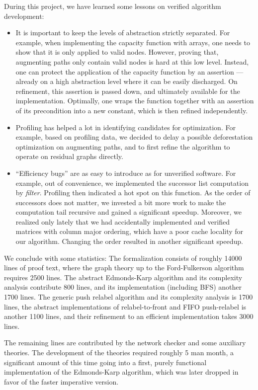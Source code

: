\documentclass[smallcondensed]{svjour3}     %
\begin{document}
  During this project, we have learned some lessons on verified algorithm development: 
  \begin{itemize}
  \item It is important to keep the levels of abstraction strictly separated.
    For example, when implementing the capacity function with arrays, one needs to show that it is only applied to valid nodes.
    However, proving that, \eg augmenting paths only contain valid nodes is hard at this low level. 
    Instead, one can protect the application of the capacity function by an assertion --- already on a high abstraction level where it can be easily discharged. 
    On refinement, this assertion is passed down, and ultimately available for the implementation.
    Optimally, one wraps the function together with an assertion of its precondition into a new constant, which is then refined independently.
  \item Profiling has helped a lot in identifying candidates for optimization. For example, based on profiling data, we decided to delay a 
    possible deforestation optimization on augmenting paths, and to first refine the algorithm to operate on residual graphs directly.
  \item ``Efficiency bugs'' are as easy to introduce as for unverified software. For example, out of convenience, we implemented the successor list computation by
    \emph{filter}. Profiling then indicated a hot spot on this function. As the order of successors does not matter, we invested a bit more work to make the computation tail 
    recursive and gained a significant speedup. Moreover, we realized only lately that we had accidentally implemented and verified
    matrices with column major ordering, which have a poor cache locality for our algorithm. Changing the order resulted in another significant speedup.
  \end{itemize}
  
  We conclude with some statistics:
  The formalization consists of roughly 14000 lines of proof text, where the graph theory up to the Ford-Fulkerson algorithm requires 2500 lines.
  The abstract Edmonds-Karp algorithm and its complexity analysis contribute 800 lines, and its implementation (including BFS) another 1700 lines.
  The generic push relabel algorithm and its complexity analysis is 1700 lines, the abstract implementations of relabel-to-front and FIFO push-relabel is another 1100 lines,
  and their refinement to an efficient implementation takes 3000 lines.
  
  The remaining lines are contributed by the network checker and some auxiliary theories. The development of the theories required roughly 5 man month, a significant amount of this time going into a first, purely functional implementation of the Edmonds-Karp algorithm, which was later dropped in favor of the faster imperative version.
  
\end{document}
